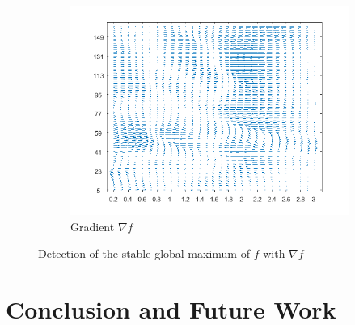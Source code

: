 \documentclass[11pt,a4,twosided,singlespacing,titlepagenumber=on]{scrreprt}
\numberwithin{equation}{chapter} %
\theoremstyle{remark}
\begin{document}
\begin{figure}[H]
\begin{subfigure}[t]{0.32\textwidth}
        \includegraphics[width=1\textwidth]{surf/3}
        \caption{Gradient $\nabla f$}
        \label{vol_mod_sma}
    \end{subfigure}
    \caption{Detection of the stable global maximum of $f$ with $\nabla f$}
    \label{fig:sharpe_ratio_topology}
\end{figure}

\chapter{Conclusion and Future Work}
\end{document}
